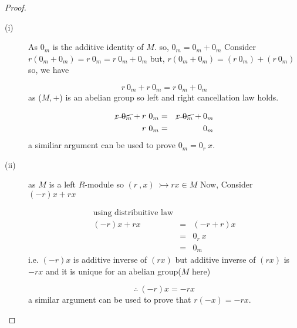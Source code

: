\begin{proof}

\begin{description}
		\item[(i)]
As $0_m$ is the additive identity of $M$. so, $0_m = 0_m + 0_m$\newline
Consider 
 $ r(0_m + 0_m) = r\ 0_m  = r\ 0_m +0_m $\newline
but, $r(0_m + 0_m) = (r\ 0_m) +(r\ 0_m)$ \newline
so, we have

\begin{equation*}
r\ 0_m +r\ 0_m = r\ 0_m + 0_m

\end{equation*}
as ($M,+$) is an abelian group so left and right cancellation law holds.

\begin{eqnarray*}
\cancel{r\ 0_m} +r\ 0_m &=& \cancel{r\ 0_m} + 0_m \\ r\ 0_m &=& 0_m

\end{eqnarray*}
a similiar argument can be used to prove $0_m = 0_r\ x$.
\item[(ii)]
as $M$ is a left $R$-module so $(r \ , x )\ \rightarrowtail rx \in M$ \newline
Now, Consider $(-r)x + rx$

\begin{eqnarray*}
\text{using distribuitive law} \\ (-r)x + rx &=& (-r + r)x \\  &=& 0_r \ x \\ &=& 0_m

\end{eqnarray*}
i.e. $(-r)x$ is additive inverse of  $(rx)$ but additive inverse of $(rx)$ is $-rx$ and it is unique for an abelian group($M$ here)

\begin{equation*}
\therefore \ (-r)x = -rx

\end{equation*}
a similar argument can be used to prove that $r(-x)  = -r x$.

\end{description}

\end{proof}
\bigskip

